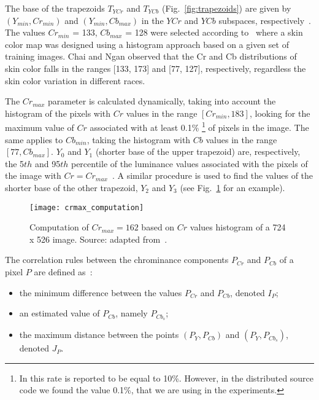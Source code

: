 The base of the trapezoids $T_{YCr}$ and $T_{YCb}$ (Fig.~\ref{fig:trapezoids}) are given by $(Y_{min}, Cr_{min})$ and $(Y_{min}, Cb_{max})$ in the $YCr$ and $YCb$ subspaces, respectively~\citep{brancati:17}. The values $Cr_{min}$ = 133, $Cb_{max}$ = 128 were selected according to~\citet{chai:99} where a skin color map was designed using a histogram approach based on a given set of training images. Chai and Ngan observed that the Cr and Cb distributions of skin color falls in the ranges [133, 173] and [77, 127], respectively, regardless the skin color variation in different races. 

The $Cr_{max}$ parameter is calculated dynamically, taking into account the histogram of the pixels with $Cr$ values in the range $[Cr_{min}, 183]$, looking for the maximum value of $Cr$ associated with at least 0.1\% \footnote{In \citet{brancati:17} this rate is reported to be equal to 10\%. However, in the distributed source code we found the value 0.1\%, that we are using in the experiments.} of pixels in the image. The same applies to $Cb_{min}$, taking the histogram with $Cb$ values in the range $[77, Cb_{max}]$. $Y_0$ and $Y_1$ (shorter base of the upper trapezoid) are, respectively, the 5${th}$ and 95$th$ percentile of the luminance values associated with the pixels of the image with $Cr = Cr_{max}$~\citep{brancati:17}. A similar procedure is used to find the values of the shorter base of the other trapezoid, $Y_2$ and $Y_3$ (see Fig.~\ref{fig:crmax_computation} for an example).

\begin{figure}[ht]
    \centering
    \texttt{[image: crmax\_computation]}
    \caption[Computation of $Cr_{max}$ based on $Cr$ values histogram of a 724 x 526 image]{Computation of $Cr_{max} = 162$ based on $Cr$ values histogram of a 724 x 526 image. Source: adapted from~\citep{brancati:17}.}
    \label{fig:crmax_computation}
\end{figure}

The correlation rules between the chrominance components $P_{Cr}$ and $P_{Cb}$ of a pixel $P$ are defined as~\citep{brancati:17}:
\begin{itemize}
    \item the minimum difference between the values $P_{Cr}$ and $P_{Cb}$, denoted $I_P$;
    \item an estimated value of $P_{Cb}$, namely $P_{Cb_s}$;
    \item the maximum distance between the points $(P_Y, P_{Cb})$ and $(P_Y, P_{Cb_s})$, denoted $J_P$.
\end{itemize}

